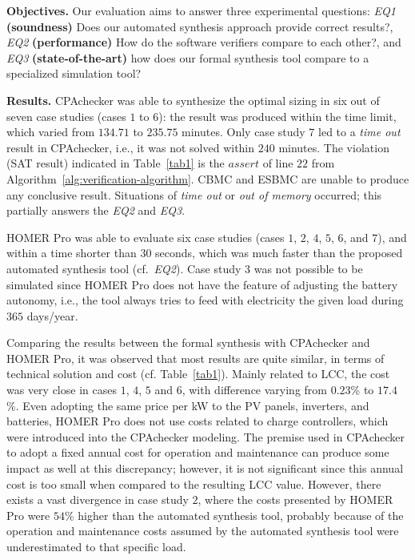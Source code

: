 \documentclass[runningheads]{llncs}
\begin{document}
\noindent \textbf{Objectives.} Our evaluation aims to answer three experimental questions: 
\textit{EQ1} \textbf{(soundness)} Does our automated synthesis approach provide correct results?, 
\textit{EQ2} \textbf{(performance)} How do the software verifiers compare to each other?, and 
\textit{EQ3} \textbf{(state-of-the-art)} how does our formal synthesis tool compare to a specialized simulation tool?

\noindent \textbf{Results.} CPAchecker was able to synthesize the optimal sizing in six out of seven case studies (cases $1$ to $6$): the result was produced within the time limit, which varied from $134.71$ to $235.75$ minutes. 
Only case study $7$ led to a \textit{time out} result in CPAchecker, i.e., it was not solved within $240$ minutes.
The violation (SAT result) indicated in Table~\ref{tab1} 
is the $assert$ of line $22$ from Algorithm~\ref{alg:verification-algorithm}. CBMC and ESBMC are unable to produce any conclusive result. Situations of \textit{time out} or \textit{out of memory} occurred; this partially answers the \textit{EQ2} and \textit{EQ3}. 

HOMER Pro was able to evaluate six case studies (cases $1$, $2$, $4$, $5$, $6$, and $7$), and within a time shorter than $30$ seconds, which was much faster than the proposed automated synthesis tool (cf.~\textit{EQ2}). Case study $3$ was not possible to be simulated since HOMER Pro does not have the feature of adjusting the battery autonomy, i.e., the tool always tries to feed with electricity the given load during $365$ days/year. 

Comparing the results between the formal synthesis with CPAchecker and HOMER Pro, it was observed that most results are quite similar, in terms of technical solution and cost (cf. Table~\ref{tab1}). Mainly related to LCC, the cost was very close in cases $1$, $4$, $5$ and $6$, with difference varying from $0.23$\% to $17.4$\%. Even adopting the same price per kW to the PV panels, inverters, and batteries, HOMER Pro does not use costs related to charge controllers, which were introduced into the CPAchecker modeling. The premise used in CPAchecker to adopt a fixed annual cost for operation and maintenance can produce some impact as well at this discrepancy; however, it is not significant since this annual cost is too small when compared to the resulting LCC value. However, there exists a vast divergence in case study $2$, where the costs presented by HOMER Pro were $54$\% higher than the automated synthesis tool, probably because of the operation and maintenance costs assumed by the automated synthesis tool were underestimated to that specific load. 
\end{document}
